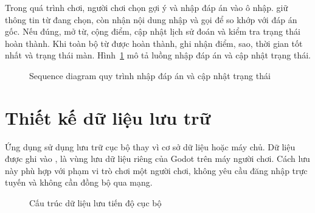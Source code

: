 \documentclass[../DoAn.tex]{subfiles}
\begin{document}
Trong quá trình chơi, người chơi chọn gợi ý và nhập đáp án vào ô nhập.  giữ thông tin từ đang chọn, còn  nhận nội dung nhập và gọi  để so khớp với đáp án gốc. Nếu đúng,  mở từ, cộng điểm, cập nhật lịch sử đoán và kiểm tra trạng thái hoàn thành. Khi toàn bộ từ được hoàn thành,  ghi nhận điểm, sao, thời gian tốt nhất và trạng thái màn. Hình~\ref{fig:sequence-nhap-dap-an} mô tả luồng nhập đáp án và cập nhật trạng thái.

\begin{figure}[H]
\centering
\resizebox{0.95\textwidth}{!}{}
\caption{Sequence diagram quy trình nhập đáp án và cập nhật trạng thái}
\label{fig:sequence-nhap-dap-an}
\end{figure}

\section{Thiết kế dữ liệu lưu trữ}
\label{section:4.4}

Ứng dụng sử dụng lưu trữ cục bộ thay vì cơ sở dữ liệu hoặc máy chủ. Dữ liệu được ghi vào , là vùng lưu dữ liệu riêng của Godot trên máy người chơi. Cách lưu này phù hợp với phạm vi trò chơi một người chơi, không yêu cầu đăng nhập trực tuyến và không cần đồng bộ qua mạng.

\begin{figure}[H]
\centering
\resizebox{0.80\textwidth}{!}{}
\caption{Cấu trúc dữ liệu lưu tiến độ cục bộ}
\label{fig:cau-truc-json-luu-tru}
\end{figure}
\end{document}
